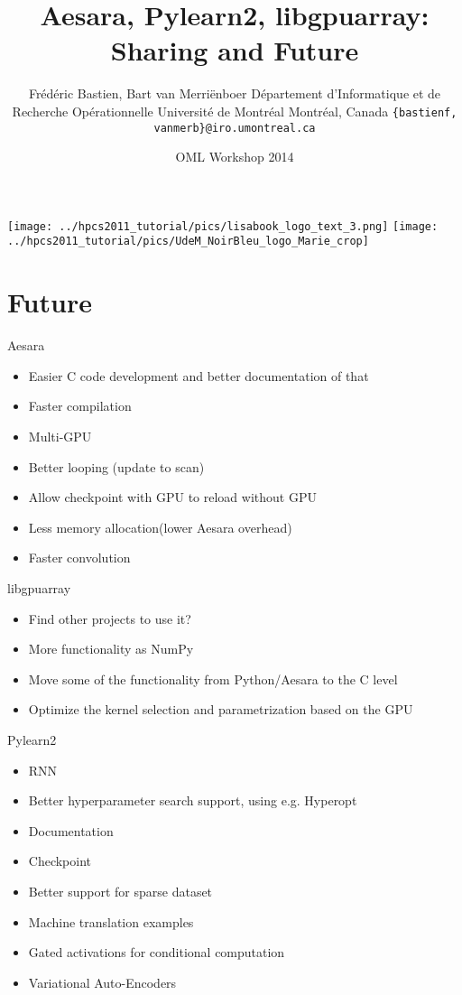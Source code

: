 \documentclass[utf8x,xcolor=pdftex,dvipsnames,table]{beamer}
\title{Aesara, Pylearn2, libgpuarray: Sharing and Future}
\author{%
\footnotesize
Frédéric Bastien, Bart van Merriënboer \newline
Département d'Informatique et de Recherche Opérationnelle \newline
Université de Montréal \newline
Montréal, Canada \newline
\texttt{\{bastienf, vanmerb\}@iro.umontreal.ca} \newline \newline
}
\date{OML Workshop 2014}
\begin{document}
\begin{frame}[plain]
 \titlepage
 \vspace{-5em}
 \texttt{[image: ../hpcs2011\_tutorial/pics/lisabook\_logo\_text\_3.png]}
 \hfill
 \texttt{[image: ../hpcs2011\_tutorial/pics/UdeM\_NoirBleu\_logo\_Marie\_crop]}
\end{frame}

\section{Future}
\begin{frame}
  \tableofcontents[currentsection]
\end{frame}

\begin{frame}{Aesara}\setcounter{page}{1}
\begin{itemize}
\item Easier C code development and better documentation of that
\item Faster compilation
\item Multi-GPU
\item Better looping (update to scan)
\item Allow checkpoint with GPU to reload without GPU
\item Less memory allocation(lower Aesara overhead)
\item Faster convolution
\end{itemize}
\end{frame}

\begin{frame}{libgpuarray}
\begin{itemize}
\item Find other projects to use it?
\item More functionality as NumPy
\item Move some of the functionality from Python/Aesara to the C level
\item Optimize the kernel selection and parametrization based on the GPU
\end{itemize}
\end{frame}

\begin{frame}{Pylearn2}
\begin{itemize}
\item RNN
\item Better hyperparameter search support, using e.g. Hyperopt
\item Documentation
\item Checkpoint
\item Better support for sparse dataset
\item Machine translation examples
\item Gated activations for conditional computation
\item Variational Auto-Encoders
\end{itemize}
\end{frame}
\end{document}
